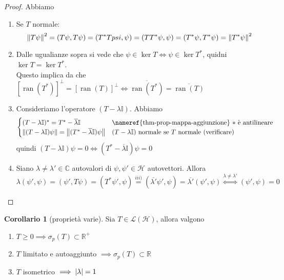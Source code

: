\documentclass[a4paper,10pt]{article}
\theoremstyle{definition}
\DeclareMathOperator*{\ran}{ran}
\newcommand{\re}{\mathbb{R}} %
\newcommand{\im}{\mathbb{C}} %
\newcommand{\hil}{\mathcal{H}} %
\theoremstyle{indentdefinition}
\theoremstyle{indenttheorem}
\newtheorem{cor}{Corollario}
\theoremstyle{myremark}
\theoremstyle{indentgeneral}
\newenvironment{myboxed} 
{\noindent\begin{lrbox}{\mybox}\begin{minipage}{\textwidth}}
{\end{minipage}\end{lrbox}\fbox{\usebox{\mybox}}}
\begin{document}
\begin{proof}
    Abbiamo
    \begin{enumerate}
        \item Se $T$ normale:
        $$\norm{T\psi}^2=(T\psi,T\psi)=(T^*Tpsi,\psi)=(TT^*\psi,\psi)=(T^*\psi,T^*\psi)=\norm{T^*\psi}^2$$
        \item Dalle ugualianze sopra si vede che $\psi\in\ker T\iff \psi\in \ker T^*$, quidni $\ker T=\ker T^*$. \\
        Questo implica da  che $[\ran(T^*)]^\perp=[\ran(T)]^\perp\iff\overline{\ran(T^*)}=\overline{\ran(T)}$
        \item Consideriamo l'operatore $(T-\lambda \mathbb{I})$. Abbiamo
        $$\begin{cases}
            (T-\lambda \mathbb{I})^*=T^*-\overline{\lambda}\mathbb{I} &\text{\nameref{thm-prop-mappa-aggiunzione} $*$ è antilineare}\\
            \norm{(T-\lambda \mathbb{I})\psi}=\norm{(T^*-\overline{\lambda}\mathbb{I})\psi} & (T-\lambda \mathbb{I}) \text{ normale se $T$ normale (verificare)}
        \end{cases}$$
        quindi $(T-\lambda \mathbb{I})\psi=0\iff(T^*-\overline{\lambda}\mathbb{I})\psi=0 $
        \item Siano $\lambda\ne\lambda'\in\im$ autovalori di $\psi,\psi'\in\hil$ autovettori. Allora
        $$\lambda(\psi',\psi)=(\psi',T\psi)=(T^*\psi',\psi)\overset{iii)}{=}(\overline{\lambda'}\psi',\psi)=\overline{\lambda'}(\psi',\psi)\overset{\lambda\ne\lambda'}{\iff}(\psi',\psi)=0$$
    \end{enumerate}
\end{proof}

\begin{myboxed}
\begin{cor}[proprietà varie] \label{cor-proprietà-varie}
Sia $T\in\mathcal{L}(\hil)$, allora valgono
\begin{enumerate}

    \item $T\ge0\implies\sigma_p(T)\subset \re^+$
    \item $T$ limitato e autoaggiunto $\implies \sigma_p(T)\subset \re$
    \item $T$ isometrico $\implies \abs{\lambda}=1$
\end{enumerate}
\end{cor}
\end{myboxed}
\end{document}
